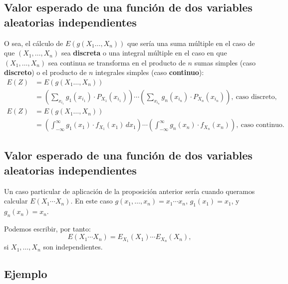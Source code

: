 \documentclass[]{book}
\begin{document}
\hypertarget{valor-esperado-de-una-funciuxf3n-de-dos-variables-aleatorias-independientes-3}{%
\subsection{Valor esperado de una función de dos variables aleatorias independientes}\label{valor-esperado-de-una-funciuxf3n-de-dos-variables-aleatorias-independientes-3}}

O sea, el cálculo de \(E(g(X_1\ldots,X_n))\) que sería una suma múltiple en el caso de que \((X_1,\ldots,X_n)\) sea \textbf{discreta} o una integral múltiple en el caso en que \((X_1,\ldots,X_n)\) sea continua se transforma en el producto de \(n\) sumas simples (caso \textbf{discreto}) o el producto de \(n\) integrales simples (caso \textbf{continuo}):
\[
\begin{array}{rl}
E(Z) & =E(g(X_1\ldots,X_n))\\ & =\left(\sum_{x_{i_1}} g_1(x_{i_1})\cdot P_{X_1}(x_{i_1})\right)\cdots \left(\sum_{x_{i_n}} g_n(x_{i_n})\cdot P_{X_n}(x_{i_n})\right), \ \mbox{caso discreto},\\
E(Z) & =E(g(X_1\ldots,X_n)) \\ & =\left(\int_{-\infty}^\infty g_1(x_1)\cdot f_{X_1}(x_1)\, dx_1\right)\cdots \left(\int_{-\infty}^\infty g_n(x_n)\cdot f_{X_n}(x_n)\right), \ \mbox{caso continuo}.
\end{array}
\]

\hypertarget{valor-esperado-de-una-funciuxf3n-de-dos-variables-aleatorias-independientes-4}{%
\subsection{Valor esperado de una función de dos variables aleatorias independientes}\label{valor-esperado-de-una-funciuxf3n-de-dos-variables-aleatorias-independientes-4}}

Un caso particular de aplicación de la proposición anterior sería cuando queramos calcular \(E(X_1\cdots X_n)\). En este caso \(g(x_1,\ldots,x_n)=x_1\cdots x_n\), \(g_1(x_1)=x_1\), y \(g_n(x_n)=x_n\).

Podemos escribir, por tanto:
\[
E(X_1\cdots X_n)=E_{X_1}(X_1)\cdots E_{X_n}(X_n),
\]
si \(X_1,\ldots,X_n\) son independientes.

\hypertarget{ejemplo-133}{%
\subsection{Ejemplo}\label{ejemplo-133}}
\end{document}
